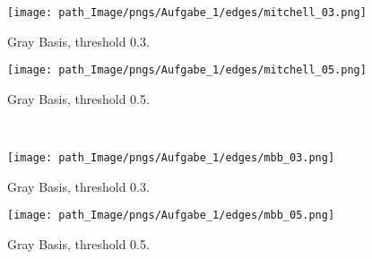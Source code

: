 \begin{figure}[!h]
\vspace{0.75cm}
\begin{minipage}{0.45\textwidth}
\centering
 \texttt{[image: path\_Image/pngs/Aufgabe\_1/edges/mitchell\_03.png]}
	\caption{Gray Basis, threshold 0.3.} 
	\label{fig_edge_modi_canti_03}
\end{minipage}
\hfill
\begin{minipage}{0.45\textwidth}
\centering
 \texttt{[image: path\_Image/pngs/Aufgabe\_1/edges/mitchell\_05.png]}
	\caption{Gray Basis, threshold 0.5.} 
	\label{fig_edge_modi_canti_05}
\end{minipage}\\

\vspace{0.75 cm}
\begin{minipage}{0.45\textwidth}
\centering
 \texttt{[image: path\_Image/pngs/Aufgabe\_1/edges/mbb\_03.png]}
	\caption{Gray Basis, threshold 0.3.} 
	\label{fig_edge_modi_mbb_03}
\end{minipage}
\hfill
\begin{minipage}{0.45\textwidth}
\centering
 \texttt{[image: path\_Image/pngs/Aufgabe\_1/edges/mbb\_05.png]}
	\caption{Gray Basis, threshold 0.5.} 
	\label{fig_edge_modi_mbb_05}
\end{minipage}
\end{figure}


